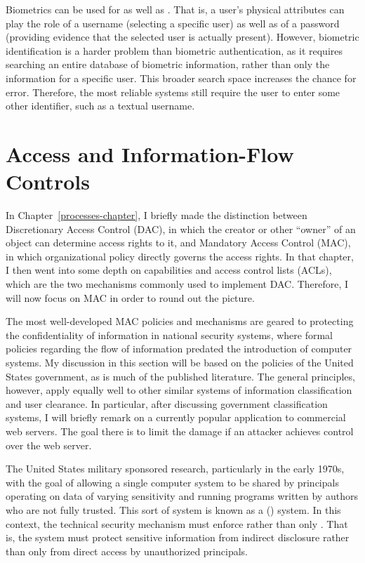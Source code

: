 Biometrics can be used for  as well as
. That is, a user's physical attributes can play
the role of a username (selecting a specific user) as well as of a
password (providing evidence that the selected user is actually
present).  However, biometric identification is a harder problem than
biometric authentication, as it requires searching an entire database
of biometric information, rather than only the information for a
specific user.  This broader search space increases the chance for
error.  Therefore, the most reliable systems still require the user to
enter some other identifier, such as a textual username.

\section{Access and Information-Flow
  Controls}\label{access-and-information-flow-controls-section}

In Chapter~\ref{processes-chapter}, I briefly made the distinction
between Discretionary Access Control (DAC), in which the creator or
other ``owner'' of an object can determine access rights to it, and
Mandatory Access Control (MAC), in which organizational policy directly
governs the access rights.  In that chapter, I then went into some
depth on capabilities and access control lists (ACLs), which are the two
mechanisms commonly used to implement DAC.  Therefore, I will now
focus on MAC in order to round out the picture.

The most well-developed MAC policies and mechanisms are geared to
protecting the confidentiality of information in national security
systems, where formal policies regarding the flow of information
predated the introduction of computer systems.  My discussion in this
section will be based on the policies of the United States government,
as is much of the published literature.  The general principles,
however, apply equally well to other similar systems of information
classification and user clearance.  In particular, after discussing
government classification systems, I will briefly remark on a
currently popular application to commercial web servers.  The goal
there is to limit the damage
if an attacker achieves control over the web server.

The United States military sponsored research, particularly in the
early 1970s, with the goal of allowing a single computer system to be
shared by principals operating on data of varying sensitivity and running
programs written by authors who are not fully trusted.  This sort of
system is known as a  ()
system.  In this context, the technical security mechanism must
enforce  rather than only
.  That is, the system must protect sensitive
information from indirect disclosure rather than only from direct
access by unauthorized principals.

